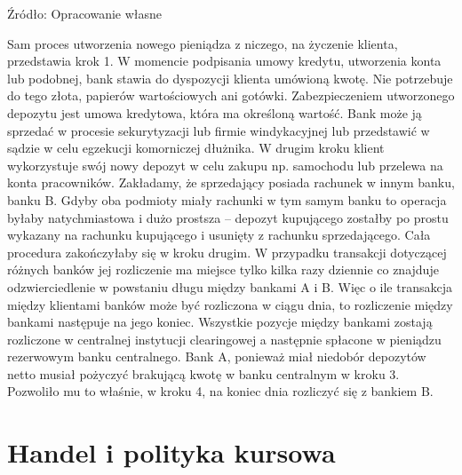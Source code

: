 \documentclass[
]{book}
\begin{document}
Źródło: Opracowanie własne

Sam proces utworzenia nowego pieniądza z niczego, na życzenie klienta, przedstawia krok 1. W momencie podpisania umowy kredytu, utworzenia konta lub podobnej, bank stawia do dyspozycji klienta umówioną kwotę. Nie potrzebuje do tego złota, papierów wartościowych ani gotówki. Zabezpieczeniem utworzonego depozytu jest umowa kredytowa, która ma określoną wartość. Bank może ją sprzedać w procesie sekurytyzacji lub firmie windykacyjnej lub przedstawić w sądzie w celu egzekucji komorniczej dłużnika. W drugim kroku klient wykorzystuje swój nowy depozyt w celu zakupu np. samochodu lub przelewa na konta pracowników. Zakładamy, że sprzedający posiada rachunek w innym banku, banku B. Gdyby oba podmioty miały rachunki w tym samym banku to operacja byłaby natychmiastowa i dużo prostsza -- depozyt kupującego zostałby po prostu wykazany na rachunku kupującego i usunięty z rachunku sprzedającego. Cała procedura zakończyłaby się w kroku drugim. W przypadku transakcji dotyczącej różnych banków jej rozliczenie ma miejsce tylko kilka razy dziennie co znajduje odzwierciedlenie w powstaniu długu między bankami A i B. Więc o ile transakcja między klientami banków może być rozliczona w ciągu dnia, to rozliczenie między bankami następuje na jego koniec. Wszystkie pozycje między bankami zostają rozliczone w centralnej instytucji clearingowej a następnie spłacone w pieniądzu rezerwowym banku centralnego. Bank A, ponieważ miał niedobór depozytów netto musiał pożyczyć brakującą kwotę w banku centralnym w kroku 3. Pozwoliło mu to właśnie, w kroku 4, na koniec dnia rozliczyć się z bankiem B.

\hypertarget{handel-i-polityka-kursowa}{%
\section{Handel i polityka kursowa}\label{handel-i-polityka-kursowa}}
\end{document}
